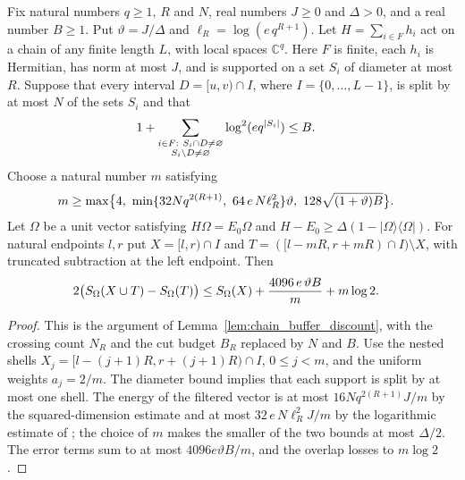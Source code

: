 \begin{lemma}
    \label{thm:chain_family_budget_discount}
    \leanok
    Fix natural numbers $q\ge1$, $R$ and $N$, real numbers $J\ge0$ and
    $\Delta>0$, and a real number $B\ge1$. Put $\vartheta=J/\Delta$ and
    $\ell_R=\log(e\,q^{R+1})$. Let $H=\sum_{i\in F}h_i$ act on a chain of any
    finite length $L$, with local spaces $\mathbb C^q$. Here $F$ is finite,
    each $h_i$ is Hermitian, has norm at most $J$, and is supported on a set
    $S_i$ of diameter at most $R$. Suppose that every interval
    $D=[u,v)\cap I$, where $I=\{0,\ldots,L-1\}$, is split by at most $N$ of
    the sets $S_i$ and that
    \begin{align}
        1+\sum_{\substack{i\in F:\ S_i\cap D\ne\varnothing \\
                S_i\setminus D\ne\varnothing}}
        \log^2(e q^{|S_i|}) & \le B.\notag
    \end{align}
    Choose a natural number $m$ satisfying
    \begin{align}
        m & \ge\max\bigl\{4,\
        \min\{32Nq^{2(R+1)},\ 64\,e\,N\ell_R^2\}\vartheta,\
        128\sqrt{(1+\vartheta)B}\bigr\}.
        \notag
    \end{align}
    Let $\Omega$ be a unit vector satisfying $H\Omega=E_0\Omega$ and
    $H-E_0\ge\Delta(1-|\Omega\rangle\langle\Omega|)$. For natural endpoints
    $l,r$ put $X=[l,r)\cap I$ and $T=(\lbrack l-mR,r+mR)\cap I)\setminus X$, with
    truncated subtraction at the left endpoint. Then
    \begin{align}
        2\bigl(S_\Omega(X\cup T)-S_\Omega(T)\bigr)
         & \le S_\Omega(X)+\frac{4096\,e\,\vartheta B}{m}+m\log2.\notag
    \end{align}
\end{lemma}
\begin{proof}
    \leanok
    This is the argument of Lemma~\ref{lem:chain_buffer_discount}, with the
    crossing count $N_R$ and the cut budget $B_R$ replaced by $N$ and $B$.
    Use the nested shells $X_j=[l-(j+1)R,r+(j+1)R)\cap I$, $0\le j<m$, and
    the uniform weights $a_j=2/m$. The diameter bound implies that each
    support is split by at most one shell. The energy of the filtered vector
    is at most $16Nq^{2(R+1)}J/m$ by the squared-dimension estimate and at
    most $32\,e\,N\ell_R^2J/m$ by the logarithmic estimate of
    \cite[Part~I, Remark~6.3]{TNLean2026OneDimensional}; the choice of $m$
    makes the smaller of the two bounds at most $\Delta/2$. The error terms
    sum to at most $4096e\vartheta B/m$, and the overlap losses to $m\log2$.
\end{proof}

